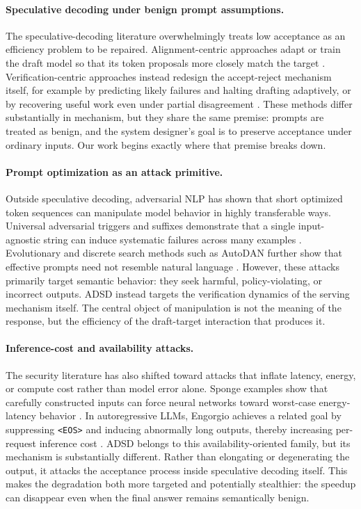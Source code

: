 \paragraph{Speculative decoding under benign prompt assumptions.}
The speculative-decoding literature overwhelmingly treats low acceptance as an
efficiency problem to be repaired. Alignment-centric approaches adapt or train
the draft model so that its token proposals more closely match the target
\citep{liu2023online,goel2024direct,wang2025alignment}. Verification-centric
approaches instead redesign the accept-reject mechanism itself, for example by
predicting likely failures and halting drafting adaptively, or by recovering
useful work even under partial disagreement
\citep{agrawal2024adaedl,bachmann2025judge,zhou2026hsd}. These methods differ
substantially in mechanism, but they share the same premise: prompts are
treated as benign, and the system designer's goal is to preserve acceptance
under ordinary inputs. Our work begins exactly where that premise breaks down.

\paragraph{Prompt optimization as an attack primitive.}
Outside speculative decoding, adversarial NLP has shown that short optimized
token sequences can manipulate model behavior in highly transferable ways.
Universal adversarial triggers and suffixes demonstrate that a single
input-agnostic string can induce systematic failures across many examples
\citep{wallace2019uat,zou2023universal}. Evolutionary and discrete search
methods such as AutoDAN further show that effective prompts need not resemble
natural language \citep{liu2023autodan}. However, these attacks primarily
target semantic behavior: they seek harmful, policy-violating, or incorrect
outputs. ADSD instead targets the verification dynamics of the serving
mechanism itself. The central object of manipulation is not the meaning of the
response, but the efficiency of the draft-target interaction that produces it.

\paragraph{Inference-cost and availability attacks.}
The security literature has also shifted toward attacks that inflate latency,
energy, or compute cost rather than model error alone. Sponge examples show
that carefully constructed inputs can force neural networks toward worst-case
energy-latency behavior \citep{shumailov2021sponge}. In autoregressive LLMs,
Engorgio achieves a related goal by suppressing \texttt{<EOS>} and inducing
abnormally long outputs, thereby increasing per-request inference cost
\citep{dong2024engorgio}. ADSD belongs to this availability-oriented family,
but its mechanism is substantially different. Rather than elongating or
degenerating the output, it attacks the acceptance process inside speculative
decoding itself. This makes the degradation both more targeted and potentially
stealthier: the speedup can disappear even when the final answer remains
semantically benign.

